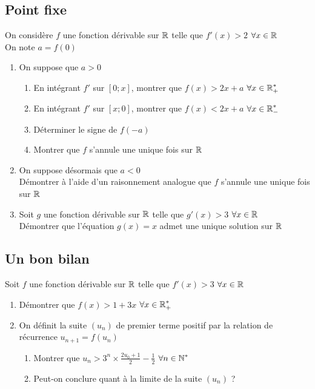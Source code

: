 \documentclass[oneside,12pt]{book}          %
\begin{document}
\subsection{Point fixe}
On considère $f$ une fonction dérivable sur ${\mathbb R}$ telle que $f'(x)>2$ \quad$\forall{x\in\mathbb R}$\\
On note $a=f(0)$
\begin{enumerate}
	\item On suppose que $a>0$
	\begin{enumerate}
		\item En intégrant $f'$ sur $[0;x]$, montrer que $f(x)>2x+a$ \quad$\forall{x\in\mathbb R}_+^*$
		\item En intégrant $f'$ sur $[x;0]$, montrer que $f(x)<2x+a$ \quad$\forall{x\in\mathbb R}_-^*$
		\item Déterminer le signe de $f(-a)$
		\item Montrer que $f$ s'annule une unique fois sur ${\mathbb R}$
	\end{enumerate}
	\item On suppose désormais que $a<0$\\
	Démontrer à l'aide d'un raisonnement analogue que $f$ s'annule une unique fois sur ${\mathbb R}$
	\item Soit $g$ une fonction dérivable sur ${\mathbb R}$ telle que $g'(x)>3$ \quad$\forall{x\in\mathbb R}$\\
	Démontrer que l'équation $g(x)=x$ admet une unique solution sur ${\mathbb R}$
\end{enumerate}



\subsection{Un bon bilan}
Soit $f$ une fonction dérivable sur ${\mathbb R}$ telle que $f'(x)>3$ \quad$\forall{x\in\mathbb R}$
\begin{enumerate}
	\item Démontrer que $f(x)>1+3x$ \quad$\forall{x\in\mathbb R}_+^*$
	\item On définit la suite $(u_n)$ de premier terme positif par la relation de récurrence $u_{n+1}=f(u_n)$
	\begin{enumerate}
		\item Montrer que $u_n>3^n\times\frac{2u_0+1}{2}-\frac{1}{2}$ \quad$\forall{n\in\mathbb N}^*$
		\item Peut-on conclure quant à la limite de la suite $(u_n)$ ?
	\end{enumerate}
\end{enumerate}


\end{document}
